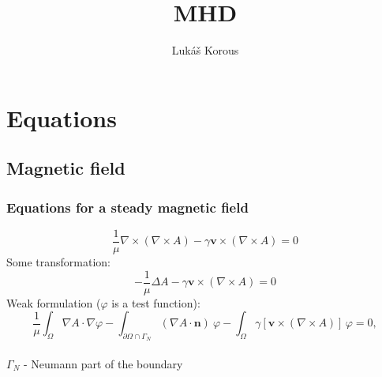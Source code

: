 \documentclass[smallextended]{svjour3}       %
\begin{document}
\title{MHD}


\author{Luk\' a\v s Korous}


\maketitle

\section{Equations}

	\subsection{Magnetic field}
	
		\subsubsection{Equations for a steady magnetic field}
		\begin{equation}
			\frac{1}{\mu}\nabla \times \left(\nabla \times A \right) - \gamma \mathbf{v} \times \left( \nabla \times A \right) = 0
		\end{equation}
		Some transformation:
		\begin{equation}
			-\frac{1}{\mu}\Delta A - \gamma \mathbf{v} \times \left( \nabla \times A \right) = 0
		\end{equation}
		Weak formulation  ($\varphi$ is a test function):
		\begin{equation}
			\frac{1}{\mu}\int_{\Omega}\nabla A \cdot \nabla \varphi - \int_{\partial \Omega \cap \Gamma_{N}} \left(\nabla A \cdot \mathbf{n}\right)\ \varphi 
			 - \int_{\Omega} \gamma \left[\mathbf{v} \times \left( \nabla \times A \right)\right]\,\varphi = 0,
		\end{equation}\ \\
		$\Gamma_{N}$ - Neumann part of the boundary\ \\
		
		
\end{document}
